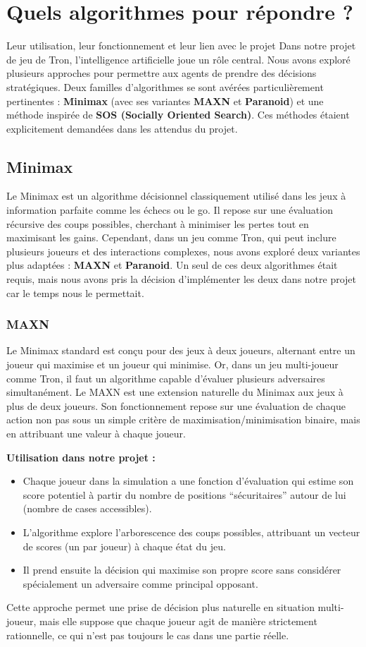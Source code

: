 \section{Quels algorithmes pour répondre ?}
Leur utilisation, leur fonctionnement et leur lien avec le projet
Dans notre projet de jeu de Tron, l'intelligence artificielle joue un rôle central. Nous avons exploré plusieurs approches pour permettre aux agents de prendre des décisions stratégiques. Deux familles d'algorithmes se sont avérées particulièrement pertinentes : \textbf{Minimax} (avec ses variantes \textbf{MAXN} et \textbf{Paranoid}) et une méthode inspirée de \textbf{SOS (Socially Oriented Search)}. Ces méthodes étaient explicitement demandées dans les attendus du projet.

\subsection{Minimax}
Le Minimax est un algorithme décisionnel classiquement utilisé dans les jeux à information parfaite comme les échecs ou le go. Il repose sur une évaluation récursive des coups possibles, cherchant à minimiser les pertes tout en maximisant les gains. Cependant, dans un jeu comme Tron, qui peut inclure plusieurs joueurs et des interactions complexes, nous avons exploré deux variantes plus adaptées : \textbf{MAXN} et \textbf{Paranoid}.
Un seul de ces deux algorithmes était requis, mais nous avons pris la décision d'implémenter les deux dans notre projet car le temps nous le permettait.

\subsubsection{MAXN}
Le Minimax standard est conçu pour des jeux à deux joueurs, alternant entre un joueur qui maximise et un joueur qui minimise. Or, dans un jeu multi-joueur comme Tron, il faut un algorithme capable d'évaluer plusieurs adversaires simultanément.
Le MAXN est une extension naturelle du Minimax aux jeux à plus de deux joueurs. Son fonctionnement repose sur une évaluation de chaque action non pas sous un simple critère de maximisation/minimisation binaire, mais en attribuant une valeur à chaque joueur.
\vspace{0.3cm}

\textbf{Utilisation dans notre projet :}
\begin{itemize}
    \item Chaque joueur dans la simulation a une fonction d'évaluation qui estime son score potentiel à partir du nombre de positions “sécuritaires” autour de lui (nombre de cases accessibles).
    \item L'algorithme explore l'arborescence des coups possibles, attribuant un vecteur de scores (un par joueur) à chaque état du jeu.
    \item Il prend ensuite la décision qui maximise son propre score sans considérer spécialement un adversaire comme principal opposant.
\end{itemize}
Cette approche permet une prise de décision plus naturelle en situation multi-joueur, mais elle suppose que chaque joueur agit de manière strictement rationnelle, ce qui n'est pas toujours le cas dans une partie réelle.

